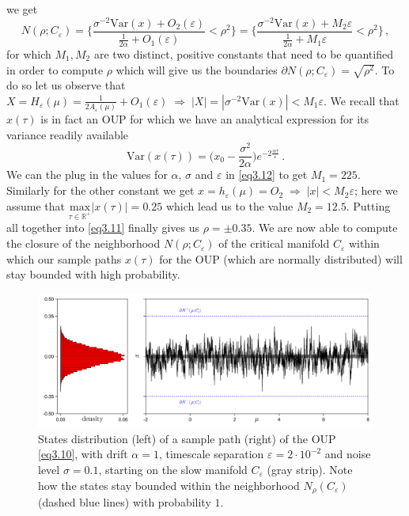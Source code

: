\documentclass[../main.tex]{subfiles}
\begin{document}
\begin{example_continued}
we get
\begin{equation}\label{eq3.11}
                N(\rho;C_{\varepsilon})=\bigg\{\frac{\sigma^{-2}\text{Var}(x)+O_{2}(\varepsilon)}{\frac{1}{2 \alpha}+O_{1}(\varepsilon)}<\rho^{2}\bigg\}=\bigg\{\frac{\sigma^{-2}\text{Var}(x)+M_{2}\varepsilon}{\frac{1}{2 \alpha}+M_{1}\varepsilon}<\rho^{2}\bigg\}\,,
\end{equation}
for which $M_{1}, M_{2}$ are two distinct, positive constants that need to be quantified in order to compute $\rho$ which will give us the boundaries $\partial N(\rho;C_{\varepsilon})=\sqrt{\rho^{2}}$.
To do so let us observe that $X=H_{\varepsilon}(\mu)=\frac{1}{2A_{\varepsilon}(\mu)}+O_{1}(\varepsilon)\;\Rightarrow\;|X|=|\sigma^{-2}\text{Var}(x)|< M_{1}\varepsilon$.
We recall that $x(\tau)$ is in fact an OUP for which we have an analytical expression for its variance readily available
\begin{equation}\label{eq3.12}
             \text{Var}(x(\tau)) = \bigg(x_0 - \frac{\sigma^2}{2 \alpha}\bigg)e^{-2\frac{\alpha\tau}{\varepsilon}}\,.
\end{equation}
We can the plug in the values for $\alpha,\,\sigma$ and $\varepsilon$ in \eqref{eq3.12} to get $M_{1}=225$.
Similarly for the other constant we get $x=h_{\varepsilon}(\mu)=O_{2}\;\Rightarrow\;|x|<M_{2}\varepsilon$; here we assume that $\underset{\tau\in \mathbb{R}^{+}}{\text{max}}|x(\tau)|=0.25$ which lead us to the value $M_{2}=12.5$. Putting all together into \eqref{eq3.11} finally gives us $\rho = \pm 0.35$.
We are now able to compute the closure of the neighborhood $N(\rho;C_{\varepsilon})$ of the critical manifold $C_{\varepsilon}$ within which our sample paths $x(\tau)$ for the OUP (which are normally distributed) will stay bounded with high probability.
\begin{figure}[H]
         \centering 
         \includegraphics[keepaspectratio, width=\textwidth]{../figures/fig3.3.png}
         \caption{States distribution (left) of a sample path (right) of the OUP \eqref{eq3.10}, with drift $\alpha=1$, timescale separation $\varepsilon=2\cdot10^{-2}$ and noise level $\sigma=0.1$, starting on the slow manifold $C_{\varepsilon}$ (gray strip). 
         Note how the states stay bounded within the neighborhood $N_{\rho}(C_{\varepsilon})$ (dashed blue lines) with probability $1$.}
         \label{fig3.3}
\end{figure}
\end{example_continued}
\end{document}
